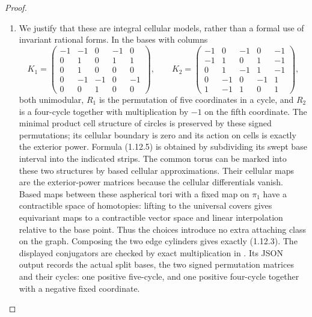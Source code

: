 \begin{proof}
\begin{enumerate}[label=\arabic*.]
\item We justify that these are integral cellular models, rather than a
formal use of invariant rational forms.  In the bases with columns
\[
K_1=\begin{pmatrix}
-1&-1&0&-1&0\\0&1&0&1&1\\0&1&0&0&0\\
0&-1&-1&0&-1\\0&0&1&0&0
\end{pmatrix},\qquad
K_2=\begin{pmatrix}
-1&0&-1&0&-1\\-1&1&0&1&-1\\0&1&-1&1&-1\\
0&-1&0&-1&1\\1&-1&1&0&1
\end{pmatrix},
\]
both unimodular, $R_1$ is the permutation of five coordinates in a
cycle, and $R_2$ is a four-cycle together with multiplication by $-1$
on the fifth coordinate.  The minimal product cell structure of
circles is preserved by these signed permutations; its cellular
boundary is zero and its action on cells is exactly the exterior
power.  Formula (1.12.5) is obtained by subdividing its swept
base interval into the indicated strips.  The common torus can be
marked into these two structures by based cellular approximations.
Their cellular maps are the exterior-power matrices because the
cellular differentials vanish.  Based maps between these aspherical
tori with a fixed map on $\pi_1$ have a contractible space of
homotopies: lifting to the universal covers gives equivariant maps
to a contractible vector space and linear interpolation relative to
the base point.  Thus the choices introduce no extra attaching class
on the graph.  Composing the two edge cylinders gives exactly
(1.12.3).  The displayed conjugators are checked by exact multiplication in
.
Its JSON output records the actual split bases, the two signed
permutation matrices and their cycles: one positive five-cycle, and
one positive four-cycle together with a negative fixed coordinate.


\end{enumerate}
\end{proof}
